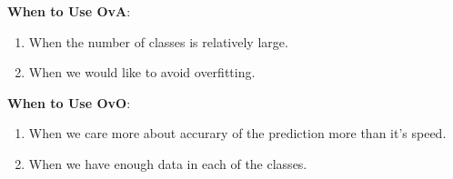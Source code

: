 \documentclass[a4paper,12pt]{article}
\begin{document}
\noindent\textbf{When to Use OvA}:
\begin{enumerate}
    \item When the number of classes is relatively large.
    \item When we would like to avoid overfitting.
\end{enumerate}

\noindent\textbf{When to Use OvO}:
\begin{enumerate}
    \item When we care more about accurary of the prediction more than it's speed.
    \item When we have enough data in each of the classes.
\end{enumerate}
\end{document}
